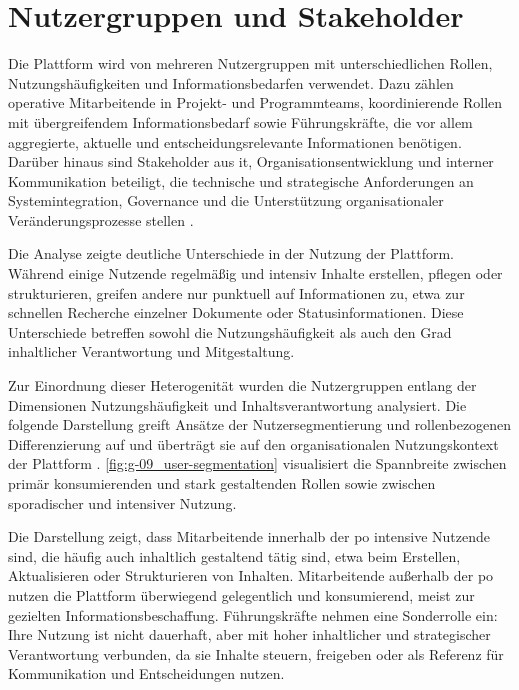 \section{Nutzergruppen und Stakeholder}
\label{sec:03-04_user-groups-and-stakeholders}

Die Plattform wird von mehreren Nutzergruppen mit unterschiedlichen Rollen, Nutzungshäufigkeiten und Informationsbedarfen verwendet. Dazu zählen operative Mitarbeitende in Projekt- und Programmteams, koordinierende Rollen mit übergreifendem Informationsbedarf sowie Führungskräfte, die vor allem aggregierte, aktuelle und entscheidungsrelevante Informationen benötigen. Darüber hinaus sind Stakeholder aus \acrshort{it}, Organisationsentwicklung und interner Kommunikation beteiligt, die technische und strategische Anforderungen an Systemintegration, Governance und die Unterstützung organisationaler Veränderungsprozesse stellen \cite{308:DWGSegmentation,112:StepTwoPersonas}.

Die Analyse zeigte deutliche Unterschiede in der Nutzung der Plattform. Während einige Nutzende regelmäßig und intensiv Inhalte erstellen, pflegen oder strukturieren, greifen andere nur punktuell auf Informationen zu, etwa zur schnellen Recherche einzelner Dokumente oder Statusinformationen. Diese Unterschiede betreffen sowohl die Nutzungshäufigkeit als auch den Grad inhaltlicher Verantwortung und Mitgestaltung.

Zur Einordnung dieser Heterogenität wurden die Nutzergruppen entlang der Dimensionen Nutzungshäufigkeit und Inhaltsverantwortung analysiert. Die folgende Darstellung greift Ansätze der Nutzersegmentierung und rollenbezogenen Differenzierung auf und überträgt sie auf den organisationalen Nutzungskontext der Plattform \cite{112:StepTwoPersonas,308:DWGSegmentation}. \autoref{fig:g-09_user-segmentation} visualisiert die Spannbreite zwischen primär konsumierenden und stark gestaltenden Rollen sowie zwischen sporadischer und intensiver Nutzung.


Die Darstellung zeigt, dass Mitarbeitende innerhalb der \acrlong{po} intensive Nutzende sind, die häufig auch inhaltlich gestaltend tätig sind, etwa beim Erstellen, Aktualisieren oder Strukturieren von Inhalten. Mitarbeitende außerhalb der \acrlong{po} nutzen die Plattform überwiegend gelegentlich und konsumierend, meist zur gezielten Informationsbeschaffung. Führungskräfte nehmen eine Sonderrolle ein: Ihre Nutzung ist nicht dauerhaft, aber mit hoher inhaltlicher und strategischer Verantwortung verbunden, da sie Inhalte steuern, freigeben oder als Referenz für Kommunikation und Entscheidungen nutzen.

